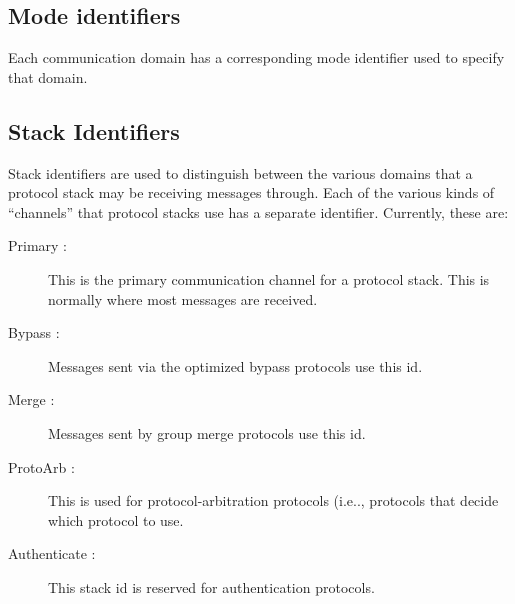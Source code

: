 \subsection{Mode identifiers}  
Each communication domain has a corresponding mode identifier used to specify that
domain.

\subsection{Stack Identifiers}
Stack identifiers are used to distinguish between the various domains that
a protocol stack may be receiving messages through.  Each of the various
kinds of ``channels'' that protocol stacks use has a separate identifier.
Currently, these are:
\begin{description}
\item
[Primary :] This is the primary communication channel for a protocol stack.
This is normally where most messages are received.
\item
[Bypass :] Messages sent via the optimized bypass protocols use this id. 
\item
[Merge :] Messages sent by group merge protocols use this id.
\item
[ProtoArb :] This is used for protocol-arbitration protocols (i.e.., protocols
that decide which protocol to use.
\item
[Authenticate :] This stack id is reserved for authentication protocols.
\end{description}
